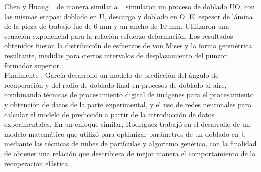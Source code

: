 Chen y Huang ~\cite{chen2007} de manera similar a ~\cite{huang1995} simularon un proceso de doblado 
UO, con las mismas etapas: doblado en U, descarga y doblado en O. El espesor de lámina de la pieza 
de trabajo fue de 6 mm y un ancho de 10 mm. Utilizaron una ecuación exponencial para la relación 
esfuerzo-deformación. Los resultados obtenidos fueron la distribución 
de esfuerzos de von Mises y la forma geométrica resultante, medidas para ciertos intervalos 
de desplazamiento del punzon formador superior. \\



Finalmente , García \cite{garcia2005} desarrolló un modelo de predicción del ángulo de recuperación y del 
radio de doblado final en procesos de doblado al aire, combinando técnicas de procesamiento digital 
de imágenes para el procesamiento y obtención de datos de la parte experimental, y el uso de redes neuronales 
para calcular el modelo de predicción a partir de la introducción de datos experimentales. En un enfoque 
similar, Rodríguez \cite{rodriguez2014} trabajó en el desarrollo de un modelo matemático que utilizó para 
optimizar parámetros de un doblado en U mediante las técnicas de nubes de partículas y algoritmo  genético, 
con la finalidad de obtener una relación que describiera de mejor manera el comportamiento de la recuperación 
elástica.